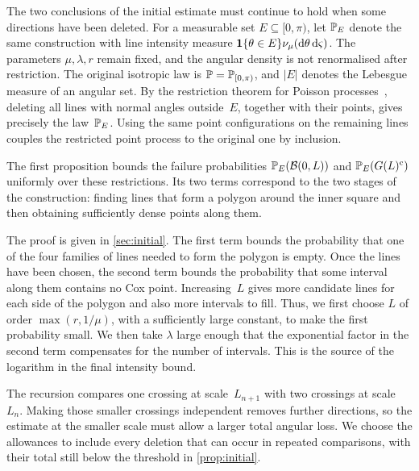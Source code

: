 \documentclass[11pt,letterpaper]{article}
\begin{document}
The two conclusions of the initial estimate must continue to hold when some directions have been deleted. For a measurable set $E\subseteq[0,\pi)$, let $\P_E$ denote the same construction with line intensity measure $\1\{\theta\in E\}\nu_\mu(\d\theta\,\d \varsigma)$. The parameters $\mu,\lambda,r$ remain fixed, and the angular density is not renormalised after restriction. The original isotropic law is $\P=\P_{[0,\pi)}$, and $\lvert E\rvert$ denotes the Lebesgue measure of an angular set. By the restriction theorem for Poisson processes~\cite[Theorem~5.2]{LP17}, deleting all lines with normal angles outside~$E$, together with their points, gives precisely the law~$\P_E$. Using the same point configurations on the remaining lines couples the restricted point process to the original one by inclusion.

The first proposition bounds the failure probabilities $\P_E(\cB(0,L))$ and $\P_E(G(L)^\c)$ uniformly over these restrictions. Its two terms correspond to the two stages of the construction: finding lines that form a polygon around the inner square and then obtaining sufficiently dense points along them.

\begin{proposition}[Uniform initial-scale estimate]
\label[proposition]{prop:initial}
There are universal constants $c,C_0>0$ such that, whenever $\lvert[0,\pi)\setminus E\rvert\le10^{-3}$ and $L\in h\N$ with $L\ge r$,
\begin{equation*}
  \max\bigl\{\P_E(\cB(0,L)),\ \P_E(G(L)^\c)\bigr\}\le C_0\e^{-c\mu L}+C_0(1+L/r)\e^{-c\lambda r}\,.
\end{equation*}
\end{proposition}
The proof is given in \cref{sec:initial}.
The first term bounds the probability that one of the four families of lines needed to form the polygon is empty. Once the lines have been chosen, the second term bounds the probability that some interval along them contains no Cox point. Increasing~$L$ gives more candidate lines for each side of the polygon and also more intervals to fill. Thus, we first choose $L$ of order $\max(r,1/\mu)$, with a sufficiently large constant, to make the first probability small. We then take $\lambda$ large enough that the exponential factor in the second term compensates for the number of intervals. This is the source of the logarithm in the final intensity bound.

The recursion compares one crossing at scale~$L_{n+1}$ with two crossings at scale~$L_n$. Making those smaller crossings independent removes further directions, so the estimate at the smaller scale must allow a larger total angular loss. We choose the allowances to include every deletion that can occur in repeated comparisons, with their total still below the threshold in \cref{prop:initial}.
\end{document}
